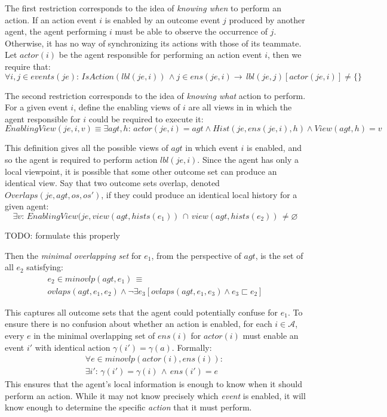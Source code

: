 The first restriction corresponds to the idea of \emph{knowing when}
to perform an action. If an action event $i$ is enabled by an outcome
event $j$ produced by another agent, the agent performing $i$ must
be able to observe the occurrence of $j$. Otherwise, it has no way
of synchronizing its actions with those of its teammate. Let $actor(i)$
be the agent responsible for performing an action event $i$, then
we require that:\[
\forall i,j\in events(je):\, IsAction(lbl(je,i))\,\wedge j\in ens(je,i)\rightarrow\, lbl(je,j)[actor(je,i)]\neq\{\}\]


The second restriction corresponds to the idea of \emph{knowing what}
action to perform. For a given event $i$, define the enabling views
of $i$ are all views in in which the agent responsible for $i$ could
be required to execute it:\[
EnablingView(je,i,v)\equiv\exists agt,h:\, actor(je,i)=agt\wedge Hist(je,ens(je,i),h)\wedge View(agt,h)=v\]


This definition gives all the possible views of $agt$ in which event
$i$ is enabled, and so the agent is required to perform action $lbl(je,i)$.
Since the agent has only a local viewpoint, it is possible that some
other outcome set can produce an identical view. Say that two outcome
sets overlap, denoted $Overlaps(je,agt,os,os')$, if they could produce
an identical local history for a given agent:\[
\exists v:\, EnablingView(je,view(agt,hists(e_{1}))\,\cap\, view(agt,hists(e_{2}))\,\neq\varnothing\]


TODO: formulate this properly

Then the \emph{minimal overlapping set} for $e_{1}$, from the perspective
of $agt$, is the set of all $e_{2}$ satisfying:\begin{multline*}
e_{2}\in minovlp(agt,e_{1})\,\equiv\\
ovlaps(agt,e_{1},e_{2})\wedge\neg\exists e_{3}\left[ovlaps(agt,e_{1},e_{3})\wedge e_{3}\sqsubset e_{2}\right]\end{multline*}


This captures all outcome sets that the agent could potentially confuse
for $e_{1}$. To ensure there is no confusion about whether an action
is enabled, for each $i\in\mathcal{A}$, every $e$ in the minimal
overlapping set of $ens(i)$ for $actor(i)$ must enable an event
$i'$ with identical action $\gamma(i')=\gamma(a)$. Formally:\begin{multline*}
\forall e\in minovlp(actor(i),ens(i)):\,\\
\exists i':\,\gamma(i')=\gamma(i)\,\wedge\, ens(i')=e\end{multline*}
 This ensures that the agent's local information is enough to know
when it should perform an action. While it may not know precisely
which \emph{event} is enabled, it will know enough to determine the
specific \emph{action} that it must perform.

